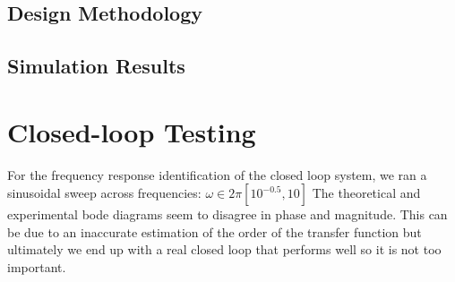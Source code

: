 \documentclass[11pt]{article}
\begin{document}
\subsection{Design Methodology}

\subsection{Simulation Results}




\section{Closed-loop Testing}
\label{sec:closedLoop}



For the frequency response identification of the closed loop system, we ran a sinusoidal sweep across frequencies: $\omega \in 2 \pi [10^{-0.5},10]$
The theoretical and experimental bode diagrams seem to disagree in phase and magnitude. This can be due to an inaccurate estimation of the order of the transfer function but ultimately we end up with a real closed loop that performs well so it is not too important.
\end{document}
